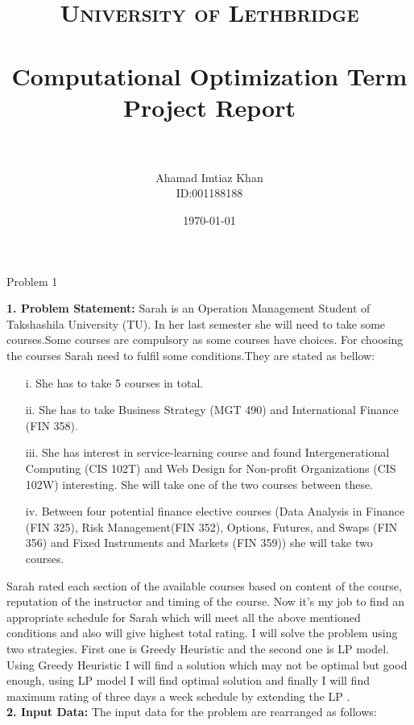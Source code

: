 \documentclass[paper=letter, fontsize=11pt]{scrartcl} %
\title{	
\normalfont \normalsize 
\textsc{University of Lethbridge} \\ [25pt] %
\horrule{0.5pt} \\[0.4cm] %
\huge Computational Optimization Term Project Report\\ %
\horrule{2pt} \\[0.5cm] %
}
\author{Ahamad Imtiaz Khan\\ID:001188188} %
\date{\normalsize\today} %
\begin{document}
\maketitle %

\begin{center}
\LARGE Problem 1
\end{center}

\Large \textbf{1. Problem Statement:}
\normalsize Sarah is an Operation Management Student of Takshashila University (TU). In her 
last semester she will need to take some courses.Some courses are compulsory as some courses have choices.
For choosing the courses Sarah need to fulfil some conditions.They are stated as bellow:
    
\begin{enumerate} [align=left,style=nextline,leftmargin=1.5cm,labelsep=\parindent,font=\normalfont]
\item[i.] She has to take 5 courses in total.
\item[ii.] She has to take Business Strategy (MGT 490) and International Finance (FIN 358).
\item[iii.] She has interest in service-learning course and found Intergenerational Computing (CIS 102T) and Web Design for Non-profit Organizations (CIS 102W) interesting. She will take one of the two courses 
between these.
\item[iv.] Between four potential finance elective courses (Data Analysis in Finance (FIN 325),
 Risk Management(FIN 352), Options, Futures, and Swaps (FIN 356) and 
Fixed Instruments and Markets (FIN 359)) she will take two courses.
\end{enumerate}

Sarah rated each section of the available courses based on content of the course, reputation of the instructor and timing of the course. Now it's my job to find an appropriate schedule for Sarah which will meet all the above mentioned conditions and also will give highest total rating. I will solve the problem using two strategies. First one is Greedy Heuristic and the second one is LP model. Using Greedy Heuristic I will find a solution which may not be optimal but good enough, using LP model I will find optimal solution and finally I will find maximum rating of three days a week schedule by extending the LP .\\
\newline
\Large \textbf{2. Input Data:}
\normalsize The input data for the problem are rearranged as follows: 
\end{document}
